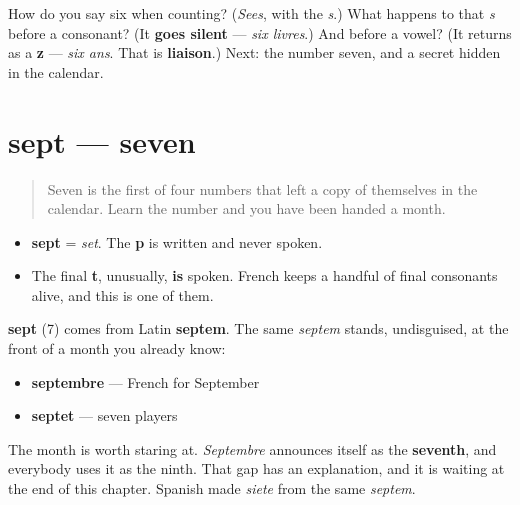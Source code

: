 \begin{tcolorbox}[breakable,colback=teal!4,colframe=teal!35!black,title={Before you move on}]
How do you say six when counting? (\emph{Sees}, with the \emph{s}.) What happens to that \emph{s} before a consonant? (It \textbf{goes silent} — \emph{six livres}.) And before a vowel? (It returns as a \textbf{z} — \emph{six ans}. That is \textbf{liaison}.) Next: the number seven, and a secret hidden in the calendar.
\end{tcolorbox}
\section[sept]{sept — seven}

\label{lesson:FR-C06-sept}



\begin{quote}
Seven is the first of four numbers that left a copy of themselves in the calendar. Learn the number and you have been handed a month.
\end{quote}

\begin{sounds}
\begin{itemize}
\raggedright
  \item \textbf{sept} = \emph{set}. The \textbf{p} is written and never spoken.
  \item The final \textbf{t}, unusually, \textbf{is} spoken. French keeps a handful of final consonants alive, and this is one of them.
\end{itemize}
\end{sounds}

\begin{cousinweb}
\textbf{sept} (7) comes from Latin \textbf{septem}. The same \emph{septem} stands, undisguised, at the front of a month you already know:

\begin{itemize}
\raggedright
  \item \textbf{septembre} — French for September
  \item \textbf{septet} — seven players
\end{itemize}

The month is worth staring at. \emph{Septembre} announces itself as the \textbf{seventh}, and everybody uses it as the ninth. That gap has an explanation, and it is waiting at the end of this chapter. Spanish made \emph{siete} from the same \emph{septem}.
\end{cousinweb}

